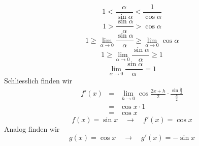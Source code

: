 \documentclass[a4paper,10pt]{report}
\begin{document}
\begin{equation*}1 < \frac{\alpha}{\sin \alpha} < \frac{1}{\cos \alpha}\end{equation*}
\begin{equation*}1 > \frac{\sin \alpha}{\alpha} > \cos \alpha\end{equation*}
\begin{equation*}1 \geq \lim_{\alpha \to 0} \frac{\sin \alpha}{\alpha} \geq \lim_{\alpha \to 0} \cos \alpha\end{equation*}
\begin{equation*}1 \geq \lim_{\alpha \to 0} \frac{\sin \alpha}{\alpha} \geq 1\end{equation*}
\begin{equation*}\boxed{\lim_{\alpha \to 0} \frac{\sin \alpha}{\alpha} = 1}\end{equation*}
Schliesslich finden wir
\begin{eqnarray}f'(x) & = & \lim_{h \to 0} \cos \frac{2x+h}{2} \cdot \frac{\sin \frac{h}{2}}{\frac{h}{2}} \nonumber \\
& = & \cos x \cdot 1 \nonumber \\
& = & \cos x\end{eqnarray}
\begin{equation*}\boxed{f(x) = \sin x \quad \to \quad f'(x) = \cos x}\end{equation*}
Analog finden wir
\begin{equation*}\boxed{g(x) = \cos x \quad \to \quad g'(x) = -\sin x}\end{equation*}
\end{document}
